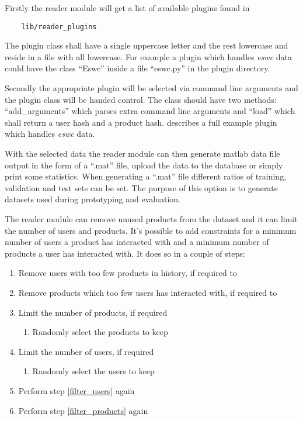 Firstly the reader module will get a list of available plugins found in

\begin{lstlisting}
    lib/reader_plugins
\end{lstlisting}

The plugin class shall have a single uppercase letter and the rest lowercase and reside in a file with all lowercase. For example a plugin which handles \textit{eswc} data could have the class ``Eswc'' inside a file ``eswc.py'' in the plugin directory.

Secondly the appropriate plugin will be selected via command line arguments and the plugin class will be handed control. The class should have two methods: ``add\_arguments'' which parses extra command line arguments and ``load'' which shall return a user hash and a product hash.  describes a full example plugin which handles \textit{eswc} data.

With the selected data the reader module can then generate matlab data file output in the form of a ``.mat'' file, upload the data to the database or simply print some statistics. When generating a ``.mat'' file different ratios of training, validation and test sets can be set. The purpose of this option is to generate datasets used during prototyping and evaluation.

The reader module can remove unused products from the dataset and it can limit the number of users and products. It's possible to add constraints for a minimum number of users a product has interacted with and a minimum number of products a user has interacted with.  It does so in a couple of steps:

\begin{enumerate}
    \item \label{filter_users} Remove users with too few products in history, if required to
    \item \label{filter_products} Remove products which too few users has interacted with, if required to

    \item Limit the number of products, if required
        \begin{enumerate}
            \item Randomly select the products to keep
        \end{enumerate}
    \item Limit the number of users, if required
        \begin{enumerate}
            \item Randomly select the users to keep
        \end{enumerate}

    \item Perform step \ref{filter_users} again
    \item Perform step \ref{filter_products} again
\end{enumerate}


